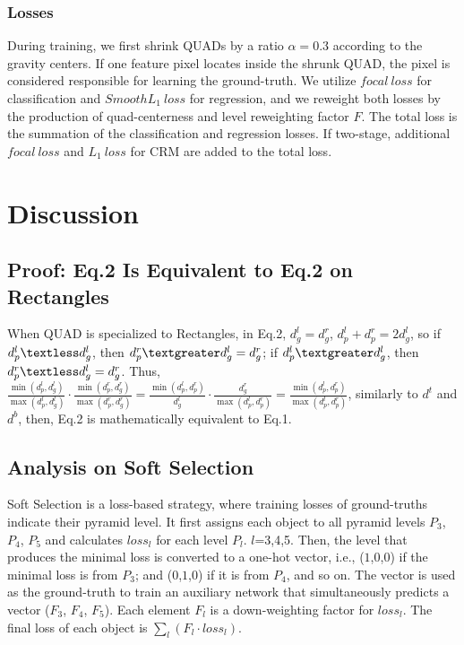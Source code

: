 \documentclass[runningheads]{llncs}
\begin{document}
\subsubsection{Losses}
During training, we first shrink QUADs by a ratio $\alpha = 0.3$  according to the gravity centers. If one feature pixel locates inside the shrunk QUAD, the pixel is considered responsible for learning the ground-truth. 
We utilize $focal~ loss$ \cite{lin2017focal} for classification and $SmoothL_1~loss$ for regression, and we reweight both losses by the production of quad-centerness and level reweighting factor $F$. The total loss is the summation of the classification and regression losses. If two-stage, additional $focal~ loss$ and $L_1~loss$ for CRM are added to the total loss.


\section{Discussion}
\subsection{Proof: Eq.2 Is Equivalent to Eq.2 on Rectangles}
When QUAD is specialized to Rectangles, in Eq.2,  $d_g^l=d_g^r$, $d_{p}^l+d_{p}^r=2d_g^l$, so if $d_p^l \textless d_g^l$, then $d_p^r \textgreater d_g^l = d_g^r$; if $d_p^l \textgreater d_g^l$, then $d_p^r \textless d_g^l = d_g^r$. Thus, $\frac{\min(d_{p}^l,d_{g}^l)}{\max(d_{p}^l, d_{g}^l) } \cdot \frac{\min(d_{p}^r,d_{g}^r)}{\max(d_{p}^r, d_{g}^r) } = \frac{\min(d_{p}^l,d_{p}^r)}{d_{g}^l } \cdot \frac{d_{g}^r}{\max(d_{p}^l, d_{p}^r) } =  \frac{\min(d_{p}^l,d_{p}^r)}{\max(d_{p}^l, d_{p}^r) }$, similarly to $d^t$ and $d^b$,  then, Eq.2 is mathematically equivalent to Eq.1.

\subsection{Analysis on Soft Selection}
Soft Selection is a loss-based strategy, where training losses of ground-truths indicate their pyramid level. It first assigns each object to all pyramid levels $P_3$, $P_4$, $P_5$ and calculates $loss_l$ for each level $P_l$. $l$=3,4,5. Then, the level that produces the minimal loss is converted to a one-hot vector, i.e., ($1$,$0$,$0$) if the minimal loss is from $P_3$; and ($0$,$1$,$0$) if it is from $P_4$, and so on. The vector is used as the ground-truth to train an auxiliary network that simultaneously predicts a vector ($F_3$, $F_4$, $F_5$). Each element $F_l$ is a down-weighting factor for $loss_l$. The final loss of each object is $\sum_l (F_l \cdot loss_l)$. 
\end{document}
